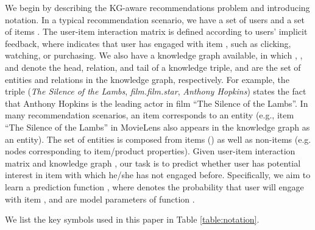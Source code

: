 \documentclass[sigconf]{acmart}
\begin{document}
	We begin by describing the KG-aware recommendations problem and introducing notation.
	In a typical recommendation scenario, we have a set of users  and a set of items .
	The user-item interaction matrix  is defined according to users' implicit feedback, where  indicates that user  has engaged with item , such as clicking, watching, or purchasing.
	We also have a knowledge graph  available, in which , , and  denote the head, relation, and tail of a knowledge triple,  and  are the set of entities and relations in the knowledge graph, respectively.
	For example, the triple (\textit{The Silence of the Lambs}, \textit{film.film.star}, \textit{Anthony Hopkins}) states the fact that Anthony Hopkins is the leading actor in film ``The Silence of the Lambs''.
	In many recommendation scenarios, an item  corresponds to an entity  (e.g., item ``The Silence of the Lambs'' in MovieLens also appears in the knowledge graph as an entity).
	The set of entities  is composed from items  () as well as non-items  (e.g. nodes corresponding to item/product properties).
	Given user-item interaction matrix  and knowledge graph , our task is to predict whether user  has potential interest in item  with which he/she has not engaged before.
	Specifically, we aim to learn a prediction function , where  denotes the probability that user  will engage with item , and  are model parameters of function .
	
	We list the key symbols used in this paper in Table \ref{table:notation}.
	
\end{document}
